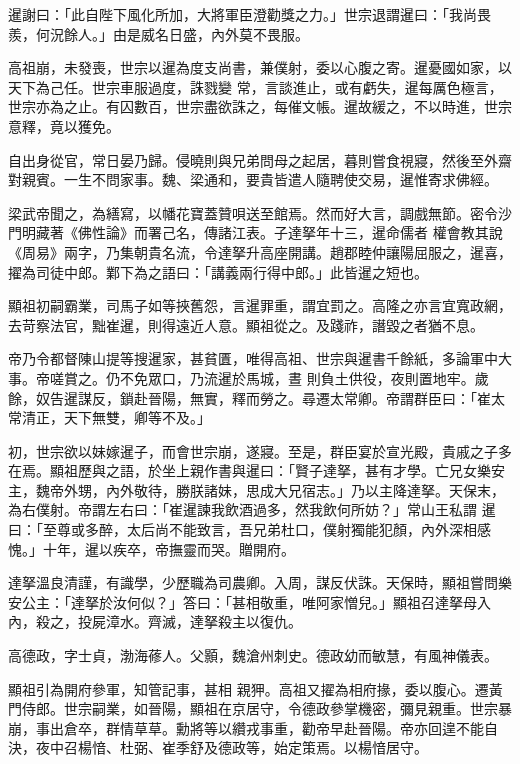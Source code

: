 \begin{pinyinscope}
 暹謝曰：「此自陛下風化所加，大將軍臣澄勸獎之力。」世宗退謂暹曰：「我尚畏羨，何況餘人。」由是威名日盛，內外莫不畏服。



 高祖崩，未發喪，世宗以暹為度支尚書，兼僕射，委以心腹之寄。暹憂國如家，以天下為己任。世宗車服過度，誅戮變
 常，言談進止，或有虧失，暹每厲色極言，世宗亦為之止。有囚數百，世宗盡欲誅之，每催文帳。暹故緩之，不以時進，世宗意釋，竟以獲免。



 自出身從官，常日晏乃歸。侵曉則與兄弟問母之起居，暮則嘗食視寢，然後至外齋對親賓。一生不問家事。魏、梁通和，要貴皆遣人隨聘使交易，暹惟寄求佛經。



 梁武帝聞之，為繕寫，以幡花寶蓋贊唄送至館焉。然而好大言，調戲無節。密令沙門明藏著《佛性論》而署己名，傳諸江表。子達拏年十三，暹命儒者
 權會教其說《周易》兩字，乃集朝貴名流，令達拏升高座開講。趙郡睦仲讓陽屈服之，暹喜，擢為司徒中郎。鄴下為之語曰：「講義兩行得中郎。」此皆暹之短也。



 顯祖初嗣霸業，司馬子如等挾舊怨，言暹罪重，謂宜罰之。高隆之亦言宜寬政網，去苛察法官，黜崔暹，則得遠近人意。顯祖從之。及踐祚，譖毀之者猶不息。



 帝乃令都督陳山提等搜暹家，甚貧匱，唯得高祖、世宗與暹書千餘紙，多論軍中大事。帝嗟賞之。仍不免眾口，乃流暹於馬城，晝
 則負土供役，夜則置地牢。歲餘，奴告暹謀反，鎖赴晉陽，無實，釋而勞之。尋遷太常卿。帝謂群臣曰：「崔太常清正，天下無雙，卿等不及。」



 初，世宗欲以妹嫁暹子，而會世宗崩，遂寢。至是，群臣宴於宣光殿，貴戚之子多在焉。顯祖歷與之語，於坐上親作書與暹曰：「賢子達拏，甚有才學。亡兄女樂安主，魏帝外甥，內外敬待，勝朕諸妹，思成大兄宿志。」乃以主降達拏。天保末，為右僕射。帝謂左右曰：「崔暹諫我飲酒過多，然我飲何所妨？」常山王私謂
 暹曰：「至尊或多醉，太后尚不能致言，吾兄弟杜口，僕射獨能犯顏，內外深相感愧。」十年，暹以疾卒，帝撫靈而哭。贈開府。



 達拏溫良清謹，有識學，少歷職為司農卿。入周，謀反伏誅。天保時，顯祖嘗問樂安公主：「達拏於汝何似？」答曰：「甚相敬重，唯阿家憎兒。」顯祖召達拏母入內，殺之，投屍漳水。齊滅，達拏殺主以復仇。



 高德政，字士貞，渤海蓚人。父顥，魏滄州刺史。德政幼而敏慧，有風神儀表。



 顯祖引為開府參軍，知管記事，甚相
 親狎。高祖又擢為相府掾，委以腹心。遷黃門侍郎。世宗嗣業，如晉陽，顯祖在京居守，令德政參掌機密，彌見親重。世宗暴崩，事出倉卒，群情草草。勳將等以纘戎事重，勸帝早赴晉陽。帝亦回遑不能自決，夜中召楊愔、杜弼、崔季舒及德政等，始定策焉。以楊愔居守。




\end{pinyinscope}
